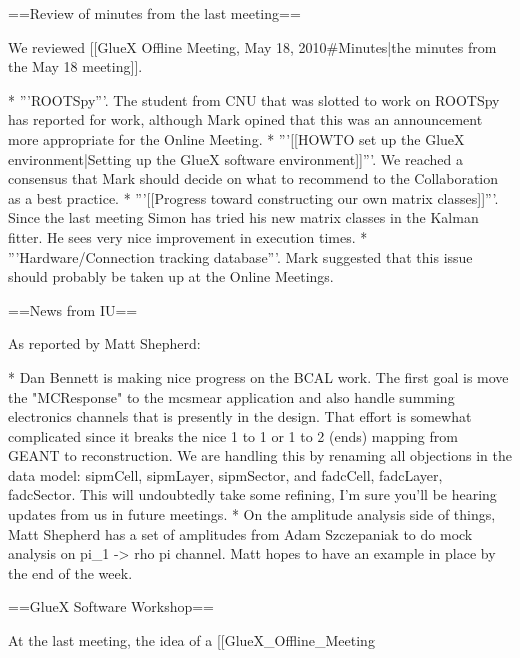 ==Review of minutes from the last meeting==

We reviewed [[GlueX Offline Meeting, May 18, 2010#Minutes|the minutes from the May 18 meeting]].

* '''ROOTSpy'''. The student from CNU that was slotted to work on ROOTSpy has reported for work, although Mark opined that this was an announcement more appropriate for the Online Meeting.
* '''[[HOWTO set up the GlueX environment|Setting up the GlueX software environment]]'''. We reached a consensus that Mark should decide on what to recommend to the Collaboration as a best practice.
* '''[[Progress toward constructing our own matrix classes]]'''. Since the last meeting Simon has tried his new matrix classes in the Kalman fitter. He sees very nice improvement in execution times.
* '''Hardware/Connection tracking database'''. Mark suggested that this issue should probably be taken up at the Online Meetings.

==News from IU==

As reported by Matt Shepherd:

* Dan Bennett is making nice progress on the BCAL work.  The first goal is move the "MCResponse" to the mcsmear application and also handle summing electronics channels that is presently in the design.  That effort is somewhat complicated since it breaks the nice 1 to 1 or 1 to 2 (ends) mapping from GEANT to reconstruction.  We are handling this by renaming all objections in the data model:  sipmCell, sipmLayer, sipmSector, and fadcCell, fadcLayer, fadcSector.  This will undoubtedly take some refining, I'm sure you'll be hearing updates from us in future meetings.
* On the amplitude analysis side of things, Matt Shepherd has a set of amplitudes from Adam Szczepaniak to do mock analysis on pi_1 -> rho pi channel.  Matt hopes to have an example in place by the end of the week.

==GlueX Software Workshop==

At the last meeting, the idea of a [[GlueX_Offline_Meeting%

